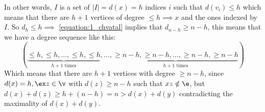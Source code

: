 \begin{prf}
\begin{itemize}
        In other words, $I$ is a set of $|I| = d(x) = h$ indices $i$ such that $d(v_i) \leq h$ which means that there are $h + 1$ vertices of degree $\leq h \implies x $ and the ones indexed by $I$. So $d_h \leq h \implies$ \ref{equation:1_chvatal} implies that $d_{n - h} \geq n - h$, this means that we have a degree sequence like this:
        \begin{equation*}
            (\underbrace{\leq h, \leq h, \dots, \leq h, \leq h}_\text{$h + 1$ times}, \dots, \underbrace{\geq n - h, \geq n - h, \dots, \geq n - h, \geq n - h}_\text{$h + 1$ times})
        \end{equation*}
        Which means that there are $h + 1$ vertices with degree $\geq n - h$, since $d(x) = h, \ex z \in \v$ with $d(z) \geq n - h$ such that $xz \notin \e$, but $d(x) + d(z) \geq h + (n - h) = n > d(x) + d(y)$ contradicting the maximality of $d(x) + d(y)$.
    \end{itemize}
\end{prf}
